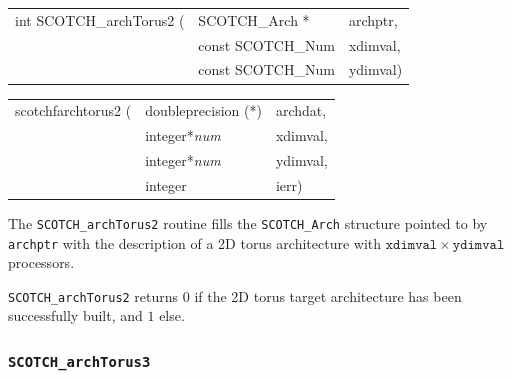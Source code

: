 \begin{itemize}
\progsyn

{\tt\begin{tabular}{l@{}ll}
int SCOTCH\_archTorus2 ( & SCOTCH\_Arch *    & archptr, \\
                         & const SCOTCH\_Num & xdimval, \\
                         & const SCOTCH\_Num & ydimval) \\
\end{tabular}}

{\tt\begin{tabular}{l@{}ll}
scotchfarchtorus2 ( & doubleprecision (*) & archdat, \\
                    & integer*{\it num}   & xdimval, \\
                    & integer*{\it num}   & ydimval, \\
                    & integer             & ierr)
\end{tabular}}

\progdes

The {\tt SCOTCH\_archTorus2} routine fills the {\tt SCOTCH\_\lbt Arch}
structure pointed to by {\tt archptr} with the description of a
2D torus architecture with $\mathtt{xdimval} \times \mathtt{ydimval}$
processors.

\progret

{\tt SCOTCH\_archTorus2} returns $0$ if the 2D torus target
architecture has been successfully built, and $1$ else.
\end{itemize}

\subsubsection{{\tt SCOTCH\_archTorus3}}

